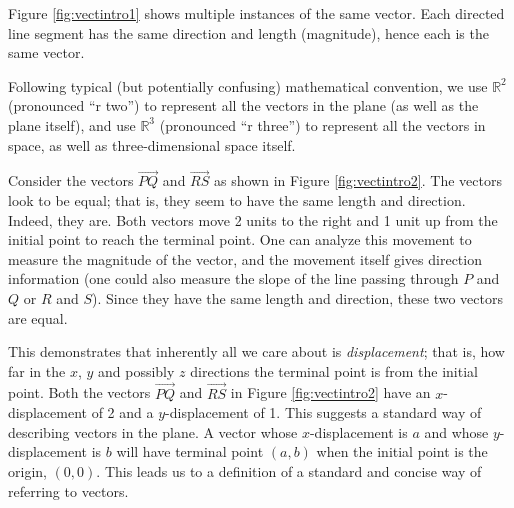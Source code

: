 Figure \ref{fig:vectintro1} shows multiple instances of the same vector. Each directed line segment has the same direction and length (magnitude), hence each is the same vector.


Following typical (but potentially confusing) mathematical convention, we use $\mathbb{R}^2$ (pronounced ``r two'') to represent all the vectors in the plane (as well as the plane itself), and use $\mathbb{R}^3$ (pronounced ``r three'') to represent all the vectors in space, as well as three-dimensional space itself.

Consider the vectors $\overrightarrow{PQ}$ and $\overrightarrow{RS}$ as shown in Figure \ref{fig:vectintro2}. The vectors look to be equal; that is, they seem to have the same length and direction. Indeed, they are. Both vectors move 2 units to the right and 1 unit up from the initial point to reach the terminal point. One can analyze this movement to measure the magnitude of the vector, and the movement itself gives direction information (one could also measure the slope of the line passing through $P$ and $Q$ or $R$ and $S$). Since they have the same length and direction, these two vectors are equal.

This demonstrates that inherently all we care about is \textit{displacement}; that is, how far in the $x$, $y$ and possibly $z$ directions the terminal point is from the initial point. Both the vectors $\overrightarrow{PQ}$ and $\overrightarrow{RS}$ in Figure \ref{fig:vectintro2} have an $x$-displacement of 2 and a $y$-displacement of 1. This suggests a standard way of describing vectors in the plane. A vector whose $x$-displacement is $a$ and whose $y$-displacement is $b$ will have terminal point $(a,b)$ when the initial point is the origin, $(0,0)$. This leads us to a definition of a standard and concise way of referring to vectors.

